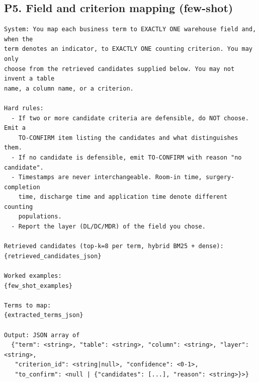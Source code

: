 \documentclass[10pt]{article}
\begin{document}
\subsection{P5. Field and criterion mapping (few-shot)}
\begin{Verbatim}[fontsize=\footnotesize,frame=single,framesep=4pt]
System: You map each business term to EXACTLY ONE warehouse field and, when the
term denotes an indicator, to EXACTLY ONE counting criterion. You may only
choose from the retrieved candidates supplied below. You may not invent a table
name, a column name, or a criterion.

Hard rules:
  - If two or more candidate criteria are defensible, do NOT choose. Emit a
    TO-CONFIRM item listing the candidates and what distinguishes them.
  - If no candidate is defensible, emit TO-CONFIRM with reason "no candidate".
  - Timestamps are never interchangeable. Room-in time, surgery-completion
    time, discharge time and application time denote different counting
    populations.
  - Report the layer (DL/DC/MDR) of the field you chose.

Retrieved candidates (top-k=8 per term, hybrid BM25 + dense):
{retrieved_candidates_json}

Worked examples:
{few_shot_examples}

Terms to map:
{extracted_terms_json}

Output: JSON array of
  {"term": <string>, "table": <string>, "column": <string>, "layer": <string>,
   "criterion_id": <string|null>, "confidence": <0-1>,
   "to_confirm": <null | {"candidates": [...], "reason": <string>}>}
\end{Verbatim}
\end{document}
